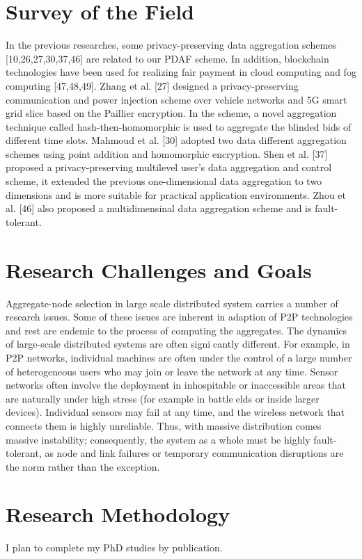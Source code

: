 \documentclass[10pt]{llncs}
\begin{document}
%
\section{Survey of the Field}
 In the previous researches, some privacy-preserving data aggregation schemes [10,26,27,30,37,46] are related to our PDAF scheme. In addition, blockchain technologies have been used for realizing fair payment in cloud computing and fog computing [47,48,49]. Zhang et al. [27] designed a privacy-preserving communication and power injection scheme over vehicle networks and 5G smart grid slice based on the Paillier encryption. In the scheme, a novel aggregation technique called hash-then-homomorphic is used to aggregate the blinded bids of different time slots. Mahmoud et al. [30] adopted two data different aggregation schemes using point addition and homomorphic encryption. Shen et al. [37] proposed a privacy-preserving multilevel user’s data aggregation and control scheme, it extended the previous one-dimensional data aggregation to two dimensions and is more suitable for practical application environments. Zhou et al. [46] also proposed a multidimensinal data aggregation scheme and is fault-tolerant.

%
\section{Research Challenges and Goals}
Aggregate-node selection in large scale distributed system carries a number of research issues.
Some of these issues are inherent in adaption of P2P technologies and rest are endemic to the
process of computing the aggregates. The dynamics of large-scale distributed systems are
often signicantly different. For example, in P2P networks, individual machines are often
under the control of a large number of heterogeneous users who may join or leave the network
at any time. Sensor networks often involve the deployment in inhospitable or inaccessible
areas that are naturally under high stress (for example in battleelds or inside larger devices).
Individual sensors may fail at any time, and the wireless network that connects them is
highly unreliable. Thus, with massive distribution comes massive instability; consequently,
the system as a whole must be highly fault-tolerant, as node and link failures or temporary
communication disruptions are the norm rather than the exception.

%
\section{Research Methodology}
I plan to complete my PhD studies by publication.
\end{document}
